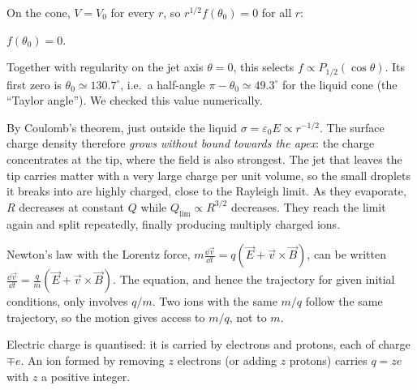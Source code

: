 \documentclass[11pt,a4paper]{article}
\newcommand{\vv}[1]{\vec{#1}}
\begin{document}
On the cone, $V = V_0$ for every $r$, so $r^{1/2}f(\theta_0) = 0$ for all $r$:
\begin{result}
$f(\theta_0) = 0$.
\end{result}
Together with regularity on the jet axis $\theta = 0$, this selects
$f\propto P_{1/2}(\cos\theta)$. Its first zero is $\theta_0\simeq130.7^\circ$, i.e.\ a
half-angle $\pi - \theta_0\simeq49.3^\circ$ for the liquid cone (the ``Taylor angle''). We
checked this value numerically.

By Coulomb's theorem, just outside the liquid $\sigma = \varepsilon_0E\propto r^{-1/2}$. The
surface charge density therefore \emph{grows without bound towards the apex}: the charge
concentrates at the tip, where the field is also strongest. The jet that leaves the tip
carries matter with a very large charge per unit volume, so the small droplets it breaks into
are highly charged, close to the Rayleigh limit. As they evaporate, $R$ decreases at constant
$Q$ while $Q_{\lim}\propto R^{3/2}$ decreases. They reach the limit again and split
repeatedly, finally producing multiply charged ions.


Newton's law with the Lorentz force,
$m\frac{\dd\vv v}{\dd t} = q(\vv E + \vv v\times\vv B)$, can be written
$\frac{\dd\vv v}{\dd t} = \frac qm(\vv E + \vv v\times\vv B)$. The equation, and hence the
trajectory for given initial conditions, only involves $q/m$. Two ions with the same $m/q$
follow the same trajectory, so the motion gives access to $m/q$, not to $m$.

Electric charge is quantised: it is carried by electrons and protons, each of charge $\mp e$.
An ion formed by removing $z$ electrons (or adding $z$ protons) carries $q = ze$ with $z$ a
positive integer.
\end{document}
